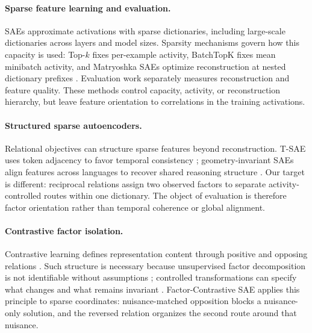 \documentclass[11pt]{article}
\begin{document}
\paragraph{Sparse feature learning and evaluation.}
SAEs approximate activations with sparse dictionaries, including large-scale dictionaries across layers and model sizes. Sparsity mechanisms govern how this capacity is used: Top-$k$ fixes per-example activity, BatchTopK fixes mean minibatch activity, and Matryoshka SAEs optimize reconstruction at nested dictionary prefixes \citep{kusupati2022matryoshka,karvonen2025saebench}. Evaluation work separately measures reconstruction and feature quality. These methods control capacity, activity, or reconstruction hierarchy, but leave feature orientation to correlations in the training activations.

\paragraph{Structured sparse autoencoders.}
Relational objectives can structure sparse features beyond reconstruction. T-SAE uses token adjacency to favor temporal consistency \citep{bhalla2026temporal}; geometry-invariant SAEs align features across languages to recover shared reasoning structure \citep{bogdanov2026geometry}. Our target is different: reciprocal relations assign two observed factors to separate activity-controlled routes within one dictionary. The object of evaluation is therefore factor orientation rather than temporal coherence or global alignment.

\paragraph{Contrastive factor isolation.}
Contrastive learning defines representation content through positive and opposing relations \citep{oord2018cpc,zimmermann2021contrastive}. Such structure is necessary because unsupervised factor decomposition is not identifiable without assumptions \citep{locatello2019disentanglement}; controlled transformations can specify what changes and what remains invariant \citep{vonkugelgen2021selfsupervised,cai2023clap}. Factor-Contrastive SAE applies this principle to sparse coordinates: nuisance-matched opposition blocks a nuisance-only solution, and the reversed relation organizes the second route around that nuisance.



\end{document}
